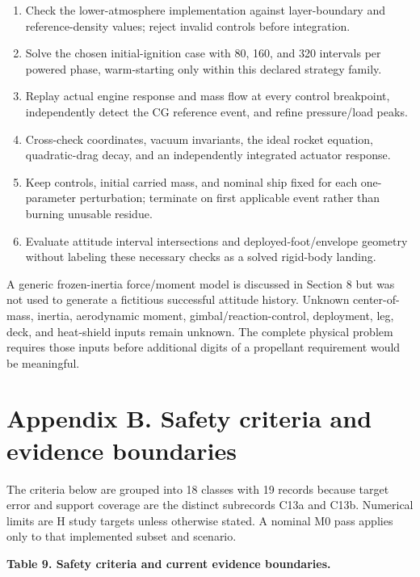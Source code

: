 \documentclass[
  11pt,
  a4paper,
]{article}
\providecommand{\tightlist}{%
  \setlength{\itemsep}{0pt}\setlength{\parskip}{0pt}}
\begin{document}
\begin{enumerate}
\def\labelenumi{\arabic{enumi}.}
\tightlist
\item
  Check the lower-atmosphere implementation against layer-boundary and
  reference-density values; reject invalid controls before integration.
\item
  Solve the chosen initial-ignition case with 80, 160, and 320 intervals
  per powered phase, warm-starting only within this declared strategy
  family.
\item
  Replay actual engine response and mass flow at every control
  breakpoint, independently detect the CG reference event, and refine
  pressure/load peaks.
\item
  Cross-check coordinates, vacuum invariants, the ideal rocket equation,
  quadratic-drag decay, and an independently integrated actuator
  response.
\item
  Keep controls, initial carried mass, and nominal ship fixed for each
  one-parameter perturbation; terminate on first applicable event rather
  than burning unusable residue.
\item
  Evaluate attitude interval intersections and deployed-foot/envelope
  geometry without labeling these necessary checks as a solved
  rigid-body landing.
\end{enumerate}

A generic frozen-inertia force/moment model is discussed in Section 8
but was not used to generate a fictitious successful attitude history.
Unknown center-of-mass, inertia, aerodynamic moment,
gimbal/reaction-control, deployment, leg, deck, and heat-shield inputs
remain unknown. The complete physical problem requires those inputs
before additional digits of a propellant requirement would be
meaningful.

\section*{Appendix B. Safety criteria and evidence
boundaries}\label{appendix-b.-safety-criteria-and-evidence-boundaries}

The criteria below are grouped into 18 classes with 19 records because
target error and support coverage are the distinct subrecords C13a and
C13b. Numerical limits are H study targets unless otherwise stated. A
nominal M0 pass applies only to that implemented subset and scenario.

\textbf{Table 9. Safety criteria and current evidence boundaries.}
\end{document}
